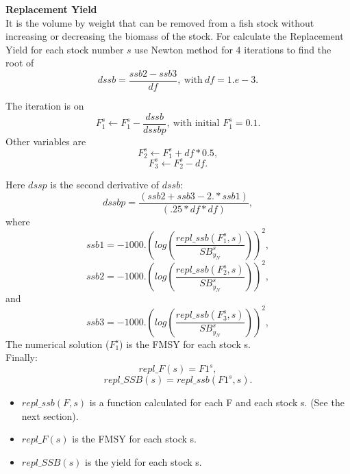 \documentclass{article}
\begin{document}
\textbf{Replacement Yield}\\
It is the volume by weight that can be removed from a fish stock without increasing or decreasing the biomass of the stock.
For calculate the Replacement Yield for each stock  number $s$ use Newton method for 4 iterations to find the root of 
\begin{equation}
    dssb   = \dfrac{ssb2 - ssb3}{df}, \ \text{with} \  df=1.e-3.
\end{equation}

The iteration is on
\begin{equation}
    F_{1}^s\leftarrow F_{1}^s-\dfrac{dssb}{dssbp}, \ \text{with initial $F_{1}^s=0.1$}.
\end{equation}
Other variables are
\begin{equation}
    F_2^s \leftarrow F_1^s+df*0.5,
\end{equation}
\begin{equation}
    F_3^s \leftarrow F_2^s -df.
\end{equation}

Here $dssp$ is the second derivative of $dssb$:
\begin{equation}
    dssbp  = \dfrac{(ssb2 + ssb3 - 2.*ssb1)}{(.25*df*df)},
\end{equation}
where
\begin{equation}
    ssb1=-1000.\left(log\left(\dfrac{repl\_ssb(F_1^s,s)}{SB^s_{y_N}}\right)\right)^2,
\end{equation}
\begin{equation}
    ssb2=-1000.\left(log\left(\dfrac{repl\_ssb(F_2^s,s)}{SB^s_{y_N}}\right)\right)^2,
\end{equation}
and
\begin{equation}
    ssb3=-1000.\left(log\left(\dfrac{repl\_ssb(F_3^s,s)}{SB^s_{y_N}}\right)\right)^2,
\end{equation}
The numerical solution ($F_1^s$) is the  FMSY for each stock s.\\
Finally:
\begin{equation}
    repl\_F(s) = F1^s,
\end{equation}
\begin{equation}
    repl\_SSB(s) = repl\_ssb(F1^s,s).
\end{equation}
\begin{itemize}
    \item $repl\_ssb(F,s)$ is a function calculated for each F and each stock s. (See the next section).
    \item $repl\_F(s)$ is the FMSY for each stock s.
    \item $repl\_SSB(s)$ is the yield for each stock s.
\end{itemize}
\end{document}
